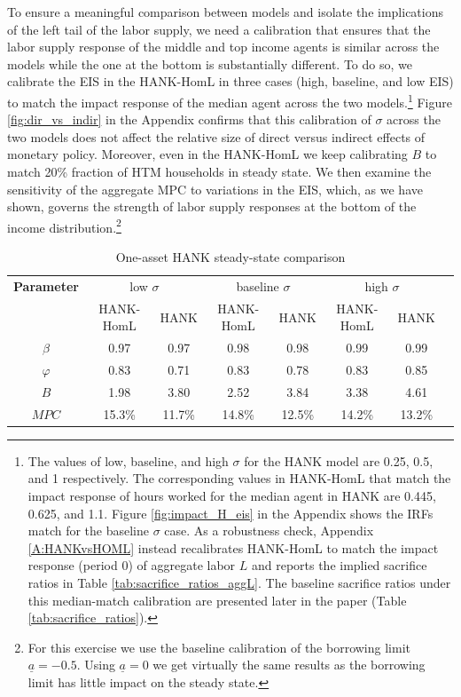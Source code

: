 \documentclass[a4paper,12pt]{article}%
\begin{document}
To ensure a meaningful comparison between models and isolate the implications of the left tail of the labor supply, we need a calibration that ensures that the labor supply response of the middle and top income agents is similar across the models while the one at the bottom is substantially different. To do so, we calibrate the EIS in the HANK-HomL in three cases (high, baseline, and low EIS) to match the impact response of the median agent across the two models.\footnote{The values of low, baseline, and high $\sigma$ for the HANK model are 0.25, 0.5, and 1 respectively. The corresponding values in HANK-HomL that match the impact response of hours worked for the median agent in HANK are 0.445, 0.625, and 1.1. Figure \ref{fig:impact_H_eis} in the Appendix shows the IRFs match for the baseline $\sigma$ case. As a robustness check, Appendix \ref{A:HANKvsHOML} instead recalibrates HANK-HomL to match the impact response (period 0) of aggregate labor $L$ and reports the implied sacrifice ratios in Table \ref{tab:sacrifice_ratios_aggL}. The baseline sacrifice ratios under this median-match calibration are presented later in the paper (Table \ref{tab:sacrifice_ratios}).} Figure \ref{fig:dir_vs_indir} in the Appendix confirms that this calibration of $\sigma$ across the two models does not affect the relative size of direct versus indirect effects of monetary policy.
Moreover, even in the HANK-HomL we keep calibrating $B$ to match 20\% fraction of HTM households in steady state. We then examine the sensitivity of the aggregate MPC to variations in the EIS, which, as we have shown, governs the strength of labor supply responses at the bottom of the income distribution.\footnote{For this exercise we use the baseline calibration of the borrowing limit $\underline{a}=-0.5$. Using $\underline{a}=0$ we get virtually the same results as the borrowing limit has little impact on the steady state.}



\begin{table}[h!]
\centering
\begin{tabular}{cccccccc}
\toprule
\textbf{Parameter} &  \multicolumn{2}{c}{low $\sigma$}   & \multicolumn{2}{c}{baseline $\sigma$} & \multicolumn{2}{c}{high $\sigma$} \\
 &  HANK-HomL &  HANK &  HANK-HomL &  HANK & HANK-HomL &  HANK   \\
\midrule
$\beta$ & 0.97 & 0.97 & 0.98& 0.98 & 0.99 & 0.99 \\
$\varphi$ & 0.83 & 0.71 & 0.83& 0.78 & 0.83 & 0.85  \\
$B$ & 1.98 & 3.80 & 2.52 & 3.84 & 3.38 & 4.61 \\
$MPC$ & 15.3\% & 11.7\% & 14.8\% & 12.5\% & 14.2\% & 13.2\% \\
\bottomrule
\end{tabular}
    \caption{One-asset HANK steady-state comparison}
    \label{tab:HANK_calib_comp}
\end{table}
\end{document}

